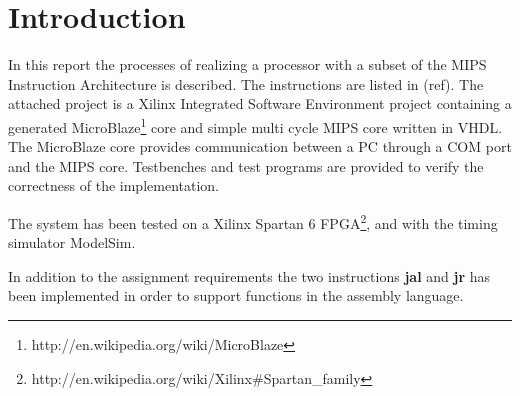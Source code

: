 \section{Introduction}

In this report the processes of realizing a processor with a subset of 
the MIPS Instruction Architecture is described. The instructions are listed 
in (ref). The attached project is a Xilinx Integrated Software Environment 
project containing a generated MicroBlaze\footnote{http://en.wikipedia.org/wiki/MicroBlaze} 
core and simple multi cycle MIPS core written in VHDL. The MicroBlaze core provides 
communication between a PC through a COM port and the MIPS core. Testbenches and 
test programs are provided to verify the correctness of the implementation. 

The system has been tested on a Xilinx Spartan 6 FPGA\footnote{http://en.wikipedia.org/wiki/Xilinx\#Spartan\_family}, 
and with the timing simulator ModelSim.

In addition to the assignment requirements the two instructions {\bf jal} and {\bf jr} has been implemented in 
order to support functions in the assembly language. 
